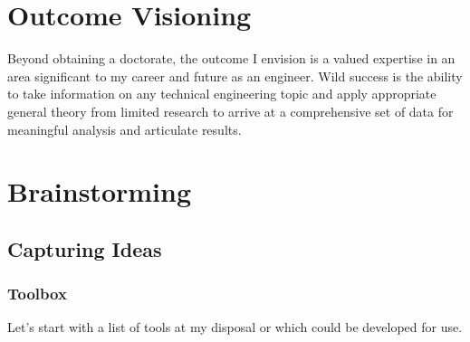 \documentclass{article}
\begin{document}
\section{Outcome Visioning}

Beyond obtaining a doctorate, the outcome I envision is a valued expertise in an area significant to my career and future as an engineer. Wild success is the ability to take information on any technical engineering topic and apply appropriate general theory from limited research to arrive at a comprehensive set of data for meaningful analysis and articulate results.

\section{Brainstorming}

\subsection{Capturing Ideas}

\subsubsection{Toolbox}
Let's start with a list of tools at my disposal or which could be developed for use.
\end{document}
